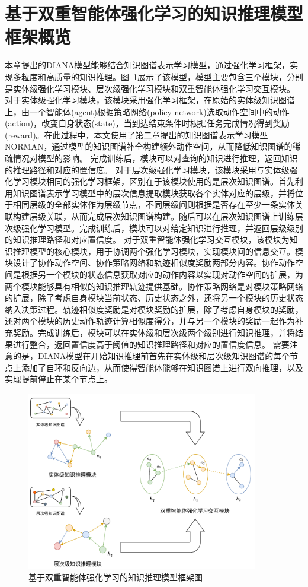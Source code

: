 \documentclass[algorithmlist, AutoFakeBold, AutoFakeSlant, figurelist, tablelist, nomlist, masters]{seuthesix}
\begin{document}
\section{基于双重智能体强化学习的知识推理模型框架概览}
本章提出的DIANA模型能够结合知识图谱表示学习模型，通过强化学习框架，实现多粒度和高质量的知识推理。图~\ref{3_LAURA}展示了该模型，模型主要包含三个模块，分别是实体级强化学习模块、层次级强化学习模块和双重智能体强化学习交互模块。
对于实体级强化学习模块，该模块采用强化学习框架，在原始的实体级知识图谱上，由一个智能体(agent)根据策略网络(policy network)选取动作空间中的动作(action)，改变自身状态(state)，当到达结束条件时根据任务完成情况得到奖励(reward)。在此过程中，本文使用了第二章提出的知识图谱表示学习模型NORMAN，通过模型的知识图谱补全构建额外动作空间，从而降低知识图谱的稀疏情况对模型的影响。
完成训练后，模块可以对查询的知识进行推理，返回知识的推理路径和对应的置信度。
对于层次级强化学习模块，该模块采用与实体级强化学习模块相同的强化学习框架，区别在于该模块使用的是层次知识图谱。首先利用知识图谱表示学习模型中的层次信息提取模块获取各个实体对应的层级，并将位于相同层级的全部实体作为层级节点，不同层级间则根据是否存在至少一条实体关联构建层级关联，从而完成层次知识图谱构建。随后可以在层次知识图谱上训练层次级强化学习模型。完成训练后，模块可以对给定知识进行推理，并返回层级级别的知识推理路径和对应置信度。
对于双重智能体强化学习交互模块，该模块为知识推理模型的核心模块，用于协调两个强化学习模块，实现模块间的信息交互。模块设计了协作动作空间、协作策略网络和轨迹相似度奖励两部分内容。协作动作空间是根据另一个模块的状态信息获取对应的动作内容以实现对动作空间的扩展，为两个模块能够具有相似的知识推理轨迹提供基础。协作策略网络是对模块策略网络的扩展，除了考虑自身模块当前状态、历史状态之外，还将另一个模块的历史状态纳入决策过程。轨迹相似度奖励是对模块奖励的扩展，除了考虑自身模块的奖励，还对两个模块的历史动作轨迹计算相似度得分，并与另一个模块的奖励一起作为补充奖励。完成训练后，模块可以在实体级和层次级两个级别进行知识推理，并将结果进行整合，返回置信度高于阈值的知识推理路径和对应的置信度信息。
需要注意的是，DIANA模型在开始知识推理前首先在实体级和层次级知识图谱的每个节点上添加了自环和反向边，从而使得智能体能够在知识图谱上进行双向推理，以及实现提前停止在某个节点上。
\begin{figure}
  \centering
  \includegraphics[width=0.9\textwidth]{3_LAURA}
  \caption{基于双重智能体强化学习的知识推理模型框架图}
  \label{3_LAURA}
\end{figure}
\end{document}
